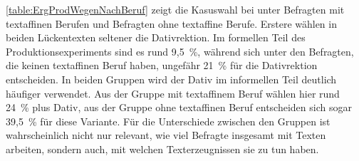 \autoref{table:ErgProdWegenNachBeruf} zeigt die Kasuswahl bei \wegen{} unter Befragten mit textaffinen Berufen und Befragten ohne textaffine Berufe.  
Erstere wählen in beiden Lückentexten seltener die Dativrektion. 
Im formellen Teil des Produktionsexperiments sind es rund 9,5~\%, während sich unter den Befragten, die keinen textaffinen Beruf haben, ungefähr 21~\% für die Dativrektion entscheiden.
In beiden Gruppen wird der Dativ im informellen Teil deutlich häufiger verwendet. 
Aus der Gruppe mit textaffinem Beruf wählen hier rund 24~\% \wegen{} plus Dativ, aus der Gruppe ohne textaffinen Beruf entscheiden sich sogar 39,5~\% für diese Variante. 
Für die Unterschiede zwischen den Gruppen ist wahrscheinlich nicht nur relevant, wie viel Befragte insgesamt mit Texten arbeiten, sondern auch, mit welchen Texterzeugnissen sie zu tun haben. 
